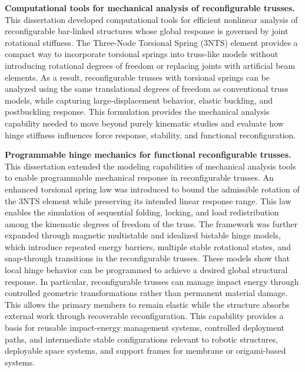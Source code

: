 \noindent{}\textbf{Computational tools for mechanical analysis of reconfigurable trusses.}
This dissertation developed computational tools for efficient nonlinear analysis of reconfigurable bar-linked structures whose global response is governed by joint rotational stiffness. The Three-Node Torsional Spring (3NTS) element provides a compact way to incorporate torsional springs into truss-like models without introducing rotational degrees of freedom or replacing joints with artificial beam elements. As a result, reconfigurable trusses with torsional springs can be analyzed using the same translational degrees of freedom as conventional truss models, while capturing large-displacement behavior, elastic buckling, and postbuckling response. This formulation provides the mechanical analysis capability needed to move beyond purely kinematic studies and evaluate how hinge stiffness influences force response, stability, and functional reconfiguration.

\noindent{}\textbf{Programmable hinge mechanics for functional reconfigurable trusses.}
This dissertation extended the modeling capabilities of mechanical analysis tools to enable programmable mechanical response in reconfigurable trusses. An enhanced torsional spring law was introduced to bound the admissible rotation of the 3NTS element while preserving its intended linear response range. This law enables the simulation of sequential folding, locking, and load redistribution among the kinematic degrees of freedom of the truss. The framework was further expanded through magnetic multistable and idealized bistable hinge models, which introduce repeated energy barriers, multiple stable rotational states, and snap-through transitions in the reconfigurable trusses. These models show that local hinge behavior can be programmed to achieve a desired global structural response. In particular, reconfigurable trusses can manage impact energy through controlled geometric transformations rather than permanent material damage. This allows the primary members to remain elastic while the structure absorbs external work through recoverable reconfiguration. This capability provides a basis for reusable impact-energy management systems, controlled deployment paths, and intermediate stable configurations relevant to robotic structures, deployable space systems, and support frames for membrane or origami-based systems.

